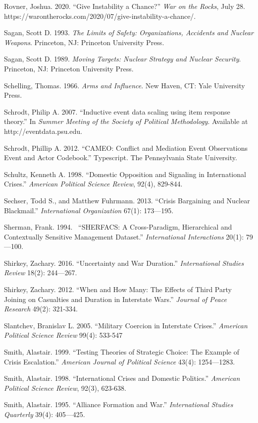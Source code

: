 \documentclass[
  letterpaper,
  DIV=11,
  numbers=noendperiod]{scrartcl}
\begin{document}
Rovner, Joshua. 2020. ``Give Instability a Chance?'' \emph{War on the
Rocks}, July 28.
https://warontherocks.com/2020/07/give-instability-a-chance/.

Sagan, Scott D. 1993. \emph{The Limits of Safety: Organizations,
Accidents and Nuclear Weapons}. Princeton, NJ: Princeton University
Press.

Sagan, Scott D. 1989. \emph{Moving Targets: Nuclear Strategy and Nuclear
Security}. Princeton, NJ: Princeton University Press.

Schelling, Thomas. 1966. \emph{Arms and Influence}. New Haven, CT: Yale
University Press.

Schrodt, Philip A. 2007. ``Inductive event data scaling using item
response theory.'' In \emph{Summer Meeting of the Society of Political
Methodology}. Available at http://eventdata.psu.edu.

Schrodt, Phillip A. 2012. ``CAMEO: Conflict and Mediation Event
Observations Event and Actor Codebook.'' Typescript. The Pennsylvania
State University.

Schultz, Kenneth A. 1998. ``Domestic Opposition and Signaling in
International Crises.'' \emph{American Political Science Review}, 92(4),
829-844.

Sechser, Todd S., and Matthew Fuhrmann. 2013. ``Crisis Bargaining and
Nuclear Blackmail.'' \emph{International Organization} 67(1):
173---195.~

Sherman, Frank. 1994.~ ``SHERFACS: A Cross-Paradigm, Hierarchical and
Contextually Sensitive Management Dataset.'' \emph{International
Interactions} 20(1): 79---100.

Shirkey, Zachary. 2016. ``Uncertainty and War Duration.''
\emph{International Studies Review} 18(2): 244---267.

Shirkey, Zachary. 2012. ``When and How Many: The Effects of Third Party
Joining on Casualties and Duration in Interstate Wars.'' \emph{Journal
of Peace Research} 49(2): 321-334.~

Slantchev, Branislav L. 2005. ``Military Coercion in Interstate
Crises.'' \emph{American Political Science Review} 99(4): 533-547

Smith, Alastair. 1999. ``Testing Theories of Strategic Choice: The
Example of Crisis Escalation.'' \emph{American Journal of Political
Science} 43(4): 1254---1283.~

Smith, Alastair. 1998. ``International Crises and Domestic Politics.''
\emph{American Political Science Review}, 92(3), 623-638.

Smith, Alastair. 1995. ``Alliance Formation and War.''
\emph{International Studies Quarterly} 39(4): 405---425.
\end{document}
